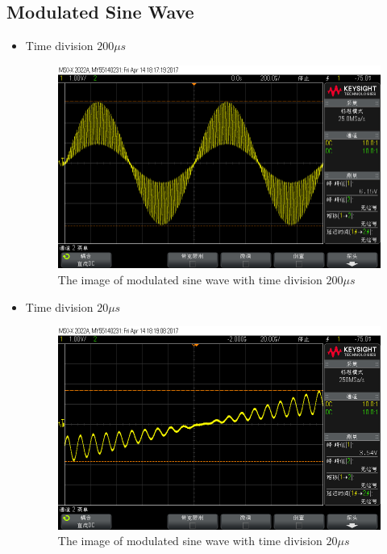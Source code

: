 \documentclass{article}
\begin{document}
\subsection{Modulated Sine Wave}
\begin{itemize}
\item Time division $200\mu s$ 
\begin{figure}[htbp]
	\centering
		\includegraphics[width=0.7\linewidth]{11.png}
	\caption{The image of modulated sine wave with time division $200\mu s$}
	\label{fig-1-1}
\end{figure}

\item Time division $20\mu s$ 
\begin{figure}[htbp]
	\centering
		\includegraphics[width=0.7\linewidth]{12.png}
	\caption{The image of modulated sine wave with time division $20\mu s$}
	\label{fig-1-2}
\end{figure}
\end{itemize}
\end{document}
